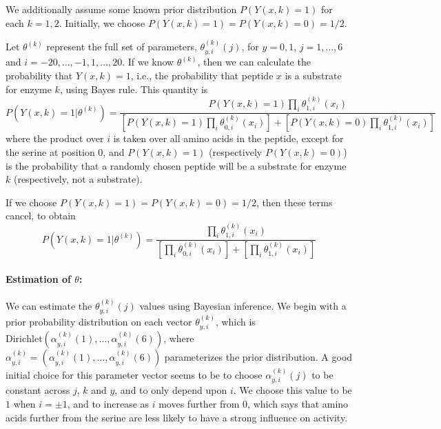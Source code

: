 \documentclass[12pt]{article}
\begin{document}
We additionally assume some known prior distribution $P(Y(x,k)=1)$ for each $k=1,2$.
Initially, we choose $P(Y(x,k)=1) = P(Y(x,k)=0) = 1/2$.

Let $\theta^{(k)}$ represent the full set of parameters, $\theta^{(k)}_{y,i}(j)$, for $y=0,1$, $j=1,\ldots,6$ and $i=-20,\ldots,-1,1,\ldots,20$.
If we know $\theta^{(k)}$, then we can calculate the probability that
$Y(x,k)=1$, i.e., the probability that peptide $x$ is a substrate for enzyme
$k$, using Bayes rule.  This quantity is
\begin{equation} \label{eq:prob_Y_orig}
  P\left(Y(x,k) = 1 | \theta^{(k)}\right) = 
  \frac{P(Y(x,k)=1) \prod_{i} \theta^{(k)}_{1,i}(x_i)}{
  \left[ P(Y(x,k)=1) \prod_{i} \theta^{(k)}_{0,i}(x_i)\right] + 
  \left[ P(Y(x,k)=0) \prod_{i} \theta^{(k)}_{1,i}(x_i)\right]}
\end{equation}
where the product over $i$ is taken over all amino acids in the peptide, except for the serine at position $0$,
and $P(Y(x,k)=1)$ (respectively $P(Y(x,k)=0)$) is the probability that a randomly chosen peptide will be a substrate for enzyme $k$ (respectively, not a substrate).

If we choose $P(Y(x,k)=1) = P(Y(x,k)=0) = 1/2$, then these terms cancel, to obtain
\begin{equation}
  \label{eq:prob_Y}
  P\left(Y(x,k) = 1 | \theta^{(k)}\right) = 
  \frac{\prod_{i} \theta^{(k)}_{1,i}(x_i)}{
  \left[ \prod_{i} \theta^{(k)}_{0,i}(x_i)\right] + 
  \left[ \prod_{i} \theta^{(k)}_{1,i}(x_i)\right]}
\end{equation}

\paragraph{Estimation of $\theta$:}
We can estimate the $\theta^{(k)}_{y,i}(j)$ values using Bayesian inference.
We begin with a prior probability distribution on each vector $\theta^{(k)}_{y,i}$, which is $\mathrm{Dirichlet}(\alpha^{(k)}_{y,i}(1),\ldots,\alpha^{(k)}_{y,i}(6))$,
where $\alpha^{(k)}_{y,i} = (\alpha^{(k)}_{y,i}(1),\ldots,\alpha^{(k)}_{y,i}(6))$ parameterizes the prior distribution.
A good initial choice for this parameter vector seems to be to choose 
$\alpha^{(k)}_{y,i}(j)$ to be constant across $j$, $k$ and $y$, and to only depend upon $i$.  
We choose this value to be $1$ when $i=\pm1$, and to increase as $i$ moves further from $0$, which says that amino acids further from the serine are less likely to have a strong influence on activity.
\end{document}
